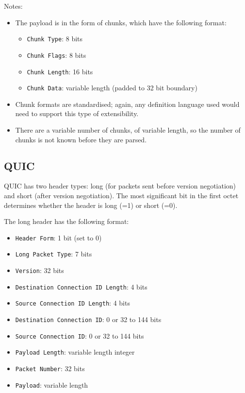 \documentclass[10pt,a4paper]{article}
\begin{document}
Notes:
\begin{itemize}
\item The payload is in the form of chunks, which have the following format:
\begin{itemize}
\item \texttt{Chunk Type}: 8 bits
\item \texttt{Chunk Flags}: 8 bits
\item \texttt{Chunk Length}: 16 bits
\item \texttt{Chunk Data}: variable length (padded to 32 bit boundary)
\end{itemize}
\item Chunk formats are standardised; again, any definition language used would need to
support this type of extensibility. 
\item There are a variable number of chunks, of variable length, so the number of chunks
is not known before they are parsed.
\end{itemize}

\subsection{QUIC}

QUIC has two header types: long (for packets sent before version negotiation) and short
(after version negotiation). The most significant bit in the first octet determines
whether the header is long (=1) or short (=0).

The long header has the following format:
\begin{itemize}
\item \texttt{Header Form}: 1 bit (set to 0)
\item \texttt{Long Packet Type}: 7 bits
\item \texttt{Version}: 32 bits
\item \texttt{Destination Connection ID Length}: 4 bits
\item \texttt{Source Connection ID Length}: 4 bits
\item \texttt{Destination Connection ID}: 0 or 32 to 144 bits
\item \texttt{Source Connection ID}: 0 or 32 to 144 bits
\item \texttt{Payload Length}: variable length integer
\item \texttt{Packet Number}: 32 bits
\item \texttt{Payload}: variable length
\end{itemize}
\end{document}
